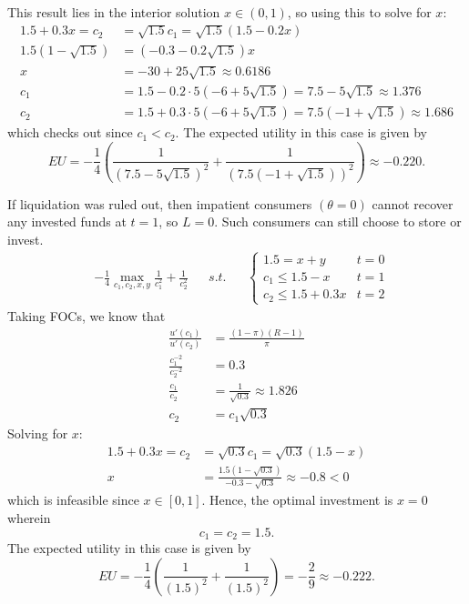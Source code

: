 \documentclass[12pt]{article}
\begin{document}
\begin{enumerate}[label=(\alph*)]
    This result lies in the interior solution $x\in(0,1)$, so using this to solve for $x$:
    \begin{align*}
       1.5+0.3x = c_2 &= \sqrt{1.5}c_1  = \sqrt{1.5}(1.5-0.2x)
       \\  1.5\left(1-\sqrt{1.5}\right)&=\left(-0.3-0.2\sqrt{1.5}\right)x
       \\ x\ &= -30+25\sqrt{1.5} \approx 0.6186
       \\ c_1 &= 1.5-0.2\cdot 5(-6+5\sqrt{1.5}) = 7.5-5\sqrt{1.5} \approx 1.376
       \\ c_2 &= 1.5+0.3\cdot 5(-6+5\sqrt{1.5}) = 7.5\left(-1+\sqrt{1.5}\right) \approx 1.686
    \end{align*}
    which checks out since $c_1<c_2.$
    The expected utility in this case is given by 
    \[ EU = -\frac{1}{4}\left( \frac{1}{(7.5-5\sqrt{1.5})^{2}}+\frac{1}{\left(7.5\left(-1+\sqrt{1.5}\right)\right) ^{2}} \right) \approx -0.220.\]
    
    \bigskip 
    If liquidation was ruled out, then impatient consumers $(\theta=0)$ cannot recover any invested funds at $t=1$, so $L=0$. Such consumers can still choose to store or invest.
    \begin{align*}
        &-\frac{1}{4}\max_{c_1, c_2, x,y} \frac{1}{c_{1}^{2}}+\frac{1}{c_{2}^{2}}  && s.t. && \begin{cases}
             1.5 =x+y & t=0
            \\ c_1 \leq 1.5-x  & t=1
            \\ c_2 \leq 1.5+0.3x & t=2
        \end{cases}
    \end{align*}
    Taking FOCs, we know that 
    \begin{align*}
         \frac{u'(c_1)}{u'(c_2)} &= \frac{(1-\pi)(R-1)}{\pi} 
         \\  \frac{c_1^{-2}} {c_2^{-2}}&= 0.3
         \\ \frac{c_1}{c_2}&= \frac{1}{\sqrt{0.3}}\approx 1.826
         \\ c_2 &= c_1 \sqrt{0.3}
    \end{align*}
    Solving for $x$:
    \begin{align*}
       1.5+0.3x = c_2 &= \sqrt{0.3}c_1  = \sqrt{0.3}( 1.5-x)
       \\ x\ &= \frac{1.5\left(1-\sqrt{0.3}\right)}{-0.3-\sqrt{0.3}} \approx -0.8<0
    \end{align*}
    which is infeasible since $x \in [0,1]$. Hence, the optimal investment is $x=0$ wherein 
    \[ c_1 =  c_2 = 1.5.\]
    The expected utility in this case is given by 
    \[ EU = -\frac{1}{4}\left( \frac{1}{(1.5)^{2}}+\frac{1}{(1.5)^{2}} \right) = -\frac{2}{9}\approx -0.222. \]
    

\end{enumerate}
\end{document}
